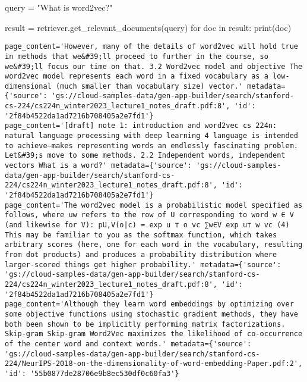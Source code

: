 \documentclass[
  letterpaper,
  DIV=11,
  numbers=noendperiod]{scrreprt}
\newenvironment{Shaded}{\begin{snugshade}}{\end{snugshade}}
\newcommand{\BuiltInTok}[1]{\textcolor[rgb]{0.00,0.23,0.31}{#1}}
\newcommand{\ControlFlowTok}[1]{\textcolor[rgb]{0.00,0.23,0.31}{#1}}
\newcommand{\KeywordTok}[1]{\textcolor[rgb]{0.00,0.23,0.31}{#1}}
\newcommand{\NormalTok}[1]{\textcolor[rgb]{0.00,0.23,0.31}{#1}}
\newcommand{\OperatorTok}[1]{\textcolor[rgb]{0.37,0.37,0.37}{#1}}
\newcommand{\StringTok}[1]{\textcolor[rgb]{0.13,0.47,0.30}{#1}}
\begin{document}
\begin{Shaded}
\begin{Highlighting}[]
\NormalTok{query }\OperatorTok{=} \StringTok{"What is word2vec?"}

\NormalTok{result }\OperatorTok{=}\NormalTok{ retriever.get\_relevant\_documents(query)}
\ControlFlowTok{for}\NormalTok{ doc }\KeywordTok{in}\NormalTok{ result:}
    \BuiltInTok{print}\NormalTok{(doc)}
\end{Highlighting}
\end{Shaded}

\begin{verbatim}
page_content='However, many of the details of word2vec will hold true in methods that we&#39;ll proceed to further in the course, so we&#39;ll focus our time on that. 3.2 Word2vec model and objective The word2vec model represents each word in a fixed vocabulary as a low-dimensional (much smaller than vocabulary size) vector.' metadata={'source': 'gs://cloud-samples-data/gen-app-builder/search/stanford-cs-224/cs224n_winter2023_lecture1_notes_draft.pdf:8', 'id': '2f84b4522da1ad7216b708405a2e7fd1'}
page_content='[draft] note 1: introduction and word2vec cs 224n: natural language processing with deep learning 4 language is intended to achieve—makes representing words an endlessly fascinating problem. Let&#39;s move to some methods. 2.2 Independent words, independent vectors What is a word?' metadata={'source': 'gs://cloud-samples-data/gen-app-builder/search/stanford-cs-224/cs224n_winter2023_lecture1_notes_draft.pdf:8', 'id': '2f84b4522da1ad7216b708405a2e7fd1'}
page_content='The word2vec model is a probabilistic model specified as follows, where uw refers to the row of U corresponding to word w ∈ V (and likewise for V): pU,V(o|c) = exp u ⊤ o vc ∑w∈V exp u⊤ w vc (4) This may be familiar to you as the softmax function, which takes arbitrary scores (here, one for each word in the vocabulary, resulting from dot products) and produces a probability distribution where larger-scored things get higher probability.' metadata={'source': 'gs://cloud-samples-data/gen-app-builder/search/stanford-cs-224/cs224n_winter2023_lecture1_notes_draft.pdf:8', 'id': '2f84b4522da1ad7216b708405a2e7fd1'}
page_content='Although they learn word embeddings by optimizing over some objective functions using stochastic gradient methods, they have both been shown to be implicitly performing matrix factorizations. Skip-gram Skip-gram Word2Vec maximizes the likelihood of co-occurrence of the center word and context words.' metadata={'source': 'gs://cloud-samples-data/gen-app-builder/search/stanford-cs-224/NeurIPS-2018-on-the-dimensionality-of-word-embedding-Paper.pdf:2', 'id': '55b0877de28706e9b8ec530df0c60fa3'}

\end{verbatim}
\end{document}

